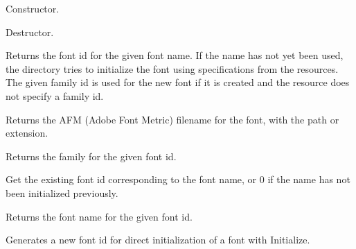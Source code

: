 
Constructor.



Destructor.



Returns the font id for the given font name. If the name has not yet been used,
the directory tries to initialize the font using specifications
from the resources. The given family id is used for the new font
if it is created and the resource does not specify a family id. 



Returns the AFM (Adobe Font Metric) filename for the font, with the path or extension.



Returns the family for the given font id.



Get the existing font id corresponding to the font name, or 0 if the name has not been
initialized previously.



Returns the font name for the given font id.



Generates a new font id for direct initialization of a
font with Initialize.



